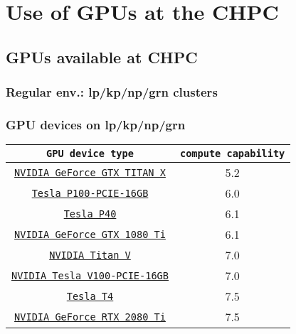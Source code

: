 \section{Use of GPUs at the CHPC}

\subsection{GPUs available at CHPC}

\subsubsection{Regular env.: lp/kp/np/grn clusters}
\begin{frame}
        \frametitle{GPU devices on lp/kp/np/grn}
\begin{table}[H]
   \begin{center}
     \begin{tabular}{c|c}
             \texttt{GPU device type} & \texttt{compute capability} \\
        \hline
	  \href{https://www.nvidia.com/en-us/geforce/graphics-cards/geforce-gtx-titan-x/specifications/}{\small{\texttt{NVIDIA GeForce GTX TITAN X}}} & \small{5.2} \\
	  \href{https://images.nvidia.com/content/tesla/pdf/nvidia-tesla-p100-PCIe-datasheet.pdf}{\small{\texttt{Tesla P100-PCIE-16GB}}} & \small{6.0} \\
	  \href{https://www.nvidia.com/content/dam/en-zz/Solutions/design-visualization/documents/nvidia-p40-datasheet.pdf}{\small{\texttt{Tesla P40}}}& \small{6.1} \\
	  \href{https://www.nvidia.com/en-us/geforce/10-series/\#1080-ti-spec}{\small{\texttt{NVIDIA GeForce GTX 1080 Ti}}}    &  \small{6.1}  \\
	  \href{https://www.gpuzoo.com/GPU-NVIDIA/Titan\_V.html}{\small{\texttt{NVIDIA Titan V}}} & \small{7.0} \\  
	  \href{https://images.nvidia.com/content/technologies/volta/pdf/tesla-volta-v100-datasheet-letter-fnl-web.pdf}{\small{\texttt{NVIDIA Tesla V100-PCIE-16GB}}} & \small{7.0} \\
	  \href{https://www.nvidia.com/content/dam/en-zz/Solutions/Data-Center/tesla-t4/t4-tensor-core-product-brief.pdf}{\small{\texttt{Tesla T4}}} & \small{7.5} \\
	  \href{https://www.techpowerup.com/gpu-specs/geforce-rtx-2080-ti.c3305}{\small{\texttt{NVIDIA GeForce RTX 2080 Ti}}} & \small{7.5} \\   

\end{tabular}
\end{center}
\end{table}
\end{frame}
